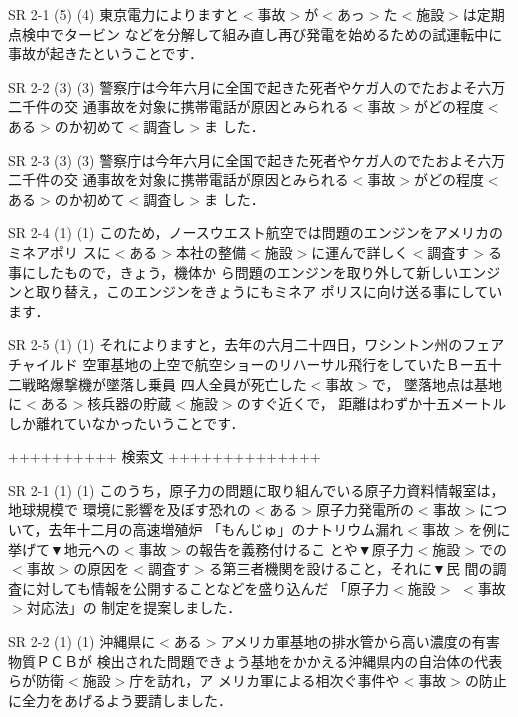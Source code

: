 SR 2-1 (5) (4)  東京電力によりますと$<$事故$>$が$<$あっ$>$た$<$施設$>$は定期点検中でタービン\break
などを分解して組み直し再び発電を始めるための試運転中に事故が起きたということです． 

SR 2-2 (3) (3)  警察庁は今年六月に全国で起きた死者やケガ人のでたおよそ六万二千件の交\break
通事故を対象に携帯電話が原因とみられる$<$事故$>$がどの程度$<$ある$>$のか初めて$<$調査し$>$ま\break
した． 

SR 2-3 (3) (3)  警察庁は今年六月に全国で起きた死者やケガ人のでたおよそ六万二千件の交\break
通事故を対象に携帯電話が原因とみられる$<$事故$>$がどの程度$<$ある$>$のか初めて$<$調査し$>$ま\break
した． 

SR 2-4 (1) (1)  このため，ノースウエスト航空では問題のエンジンをアメリカのミネアポリ\break
スに$<$ある$>$本社の整備$<$施設$>$に運んで詳しく$<$調査す$>$る事にしたもので，きょう，機体か\break
ら問題のエンジンを取り外して新しいエンジンと取り替え，このエンジンをきょうにもミネア\break
ポリスに向け送る事にしています． 

SR 2-5 (1) (1)  それによりますと，去年の六月二十四日，ワシントン州のフェアチャイルド\break
空軍基地の上空で航空ショーのリハーサル飛行をしていたＢー五十二戦略爆撃機が墜落し乗員\break
四人全員が死亡した$<$\hspace{-0.2pt}事故\hspace{-0.2pt}$>$で，
墜落地点は基地に$<$\hspace{-0.2pt}ある\hspace{-0.2pt}$>$\mbox{核兵器の貯蔵$<$\hspace{-0.2pt}施設\hspace{-0.2pt}$>$のすぐ近くで，}
距離はわずか十五メートルしか離れていなかったいうことです． 

++++++++++ 検索文 ++++++++++++++

SR 2-1 (1) (1)  このうち，原子力の問題に取り組んでいる原子力資料情報室は，地球規模で\break
環境に影響を及ぼす恐れの$<$ある$>$原子力発電所の$<$事故$>$について，去年十二月の高速増殖炉\break
「もんじゅ」のナトリウム漏れ$<$事故$>$を例に挙げて▼地元への$<$事故$>$の報告を義務付けるこ\break
とや▼原子力$<$施設$>$での$<$事故$>$の原因を$<$調査す$>$る第三者機関を設けること，それに▼民\break
間の調査に対しても情報を公開することなどを盛り込んだ
「原子力$<$施設$>$
$<$事故$>$対応法」の\break
制定を提案しました． 

SR 2-2 (1) (1)  沖縄県に$<$ある$>$アメリカ軍基地の排水管から高い濃度の有害物質ＰＣＢが\break
検出された問題できょう基地をかかえる沖縄県内の自治体の代表らが防衛$<$施設$>$庁を訪れ，ア\break
メリカ軍による相次ぐ事件や$<$事故$>$の防止に全力をあげるよう要請しました． 

